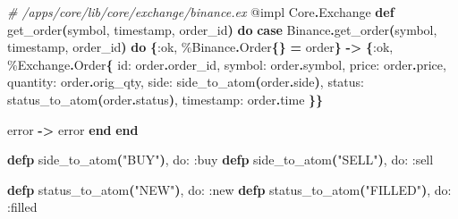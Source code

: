 \documentclass[
  oneside]{book}
\newenvironment{Shaded}{\begin{snugshade}}{\end{snugshade}}
\newcommand{\CommentTok}[1]{\textcolor[rgb]{0.56,0.35,0.01}{\textit{#1}}}
\newcommand{\ConstantTok}[1]{\textcolor[rgb]{0.56,0.35,0.01}{#1}}
\newcommand{\FunctionTok}[1]{\textcolor[rgb]{0.13,0.29,0.53}{\textbf{#1}}}
\newcommand{\KeywordTok}[1]{\textcolor[rgb]{0.13,0.29,0.53}{\textbf{#1}}}
\newcommand{\NormalTok}[1]{#1}
\newcommand{\OperatorTok}[1]{\textcolor[rgb]{0.81,0.36,0.00}{\textbf{#1}}}
\newcommand{\OtherTok}[1]{\textcolor[rgb]{0.56,0.35,0.01}{#1}}
\newcommand{\StringTok}[1]{\textcolor[rgb]{0.31,0.60,0.02}{#1}}
\newcommand{\VariableTok}[1]{\textcolor[rgb]{0.00,0.00,0.00}{#1}}
\begin{document}
\begin{Shaded}
\begin{Highlighting}[]
  \CommentTok{\# /apps/core/lib/core/exchange/binance.ex}
  \OtherTok{@impl} \ConstantTok{Core}\OperatorTok{.}\ConstantTok{Exchange}
  \KeywordTok{def}\NormalTok{ get\_order}\FunctionTok{(}\NormalTok{symbol, timestamp, order\_id}\FunctionTok{)} \KeywordTok{do}
    \KeywordTok{case} \ConstantTok{Binance}\OperatorTok{.}\NormalTok{get\_order}\FunctionTok{(}\NormalTok{symbol, timestamp, order\_id}\FunctionTok{)} \KeywordTok{do}
      \FunctionTok{\{}\VariableTok{:ok}\NormalTok{, \%}\ConstantTok{Binance}\OperatorTok{.}\ConstantTok{Order}\FunctionTok{\{\}} \OperatorTok{=}\NormalTok{ order}\FunctionTok{\}} \OperatorTok{{-}\textgreater{}}
        \FunctionTok{\{}\VariableTok{:ok}\NormalTok{,}
\NormalTok{         \%}\ConstantTok{Exchange}\OperatorTok{.}\ConstantTok{Order}\FunctionTok{\{}
           \VariableTok{id:}\NormalTok{ order}\OperatorTok{.}\NormalTok{order\_id,}
           \VariableTok{symbol:}\NormalTok{ order}\OperatorTok{.}\NormalTok{symbol,}
           \VariableTok{price:}\NormalTok{ order}\OperatorTok{.}\NormalTok{price,}
           \VariableTok{quantity:}\NormalTok{ order}\OperatorTok{.}\NormalTok{orig\_qty,}
           \VariableTok{side:}\NormalTok{ side\_to\_atom}\FunctionTok{(}\NormalTok{order}\OperatorTok{.}\NormalTok{side}\FunctionTok{)}\NormalTok{,}
           \VariableTok{status:}\NormalTok{ status\_to\_atom}\FunctionTok{(}\NormalTok{order}\OperatorTok{.}\NormalTok{status}\FunctionTok{)}\NormalTok{,}
           \VariableTok{timestamp:}\NormalTok{ order}\OperatorTok{.}\NormalTok{time}
         \FunctionTok{\}\}}

\NormalTok{      error }\OperatorTok{{-}\textgreater{}}
\NormalTok{        error}
    \KeywordTok{end}
  \KeywordTok{end}
  
  \KeywordTok{defp}\NormalTok{ side\_to\_atom}\FunctionTok{(}\StringTok{"BUY"}\FunctionTok{)}\NormalTok{, }\VariableTok{do:} \VariableTok{:buy}
  \KeywordTok{defp}\NormalTok{ side\_to\_atom}\FunctionTok{(}\StringTok{"SELL"}\FunctionTok{)}\NormalTok{, }\VariableTok{do:} \VariableTok{:sell}

  \KeywordTok{defp}\NormalTok{ status\_to\_atom}\FunctionTok{(}\StringTok{"NEW"}\FunctionTok{)}\NormalTok{, }\VariableTok{do:} \VariableTok{:new}
  \KeywordTok{defp}\NormalTok{ status\_to\_atom}\FunctionTok{(}\StringTok{"FILLED"}\FunctionTok{)}\NormalTok{, }\VariableTok{do:} \VariableTok{:filled}
\end{Highlighting}
\end{Shaded}
\end{document}
